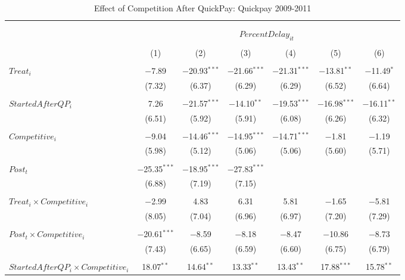 \documentclass[
]{article}
\begin{document}
\begin{table}[H] \centering 
  \caption{Effect of Competition After QuickPay: Quickpay 2009-2011} 
  \label{} 
\small 
\begin{tabular}{@{\extracolsep{-3pt}}lcccccc} 
\\[-1.8ex]\hline 
\hline \\[-1.8ex] 
\\[-1.8ex] & \multicolumn{6}{c}{$PercentDelay_{it}$  } \\ 
\\[-1.8ex] & (1) & (2) & (3) & (4) & (5) & (6)\\ 
\hline \\[-1.8ex] 
 $Treat_i$ & $-$7.89 & $-$20.93$^{***}$ & $-$21.66$^{***}$ & $-$21.31$^{***}$ & $-$13.81$^{**}$ & $-$11.49$^{*}$ \\ 
  & (7.32) & (6.37) & (6.29) & (6.29) & (6.52) & (6.64) \\ 
  & & & & & & \\ 
 $StartedAfterQP_i$ & 7.26 & $-$21.57$^{***}$ & $-$14.10$^{**}$ & $-$19.53$^{***}$ & $-$16.98$^{***}$ & $-$16.11$^{**}$ \\ 
  & (6.51) & (5.92) & (5.91) & (6.08) & (6.26) & (6.32) \\ 
  & & & & & & \\ 
 $Competitive_i$ & $-$9.04 & $-$14.46$^{***}$ & $-$14.95$^{***}$ & $-$14.71$^{***}$ & $-$1.81 & $-$1.19 \\ 
  & (5.98) & (5.12) & (5.06) & (5.06) & (5.60) & (5.71) \\ 
  & & & & & & \\ 
 $Post_t$ & $-$25.35$^{***}$ & $-$18.95$^{***}$ & $-$27.83$^{***}$ &  &  &  \\ 
  & (6.88) & (7.19) & (7.15) &  &  &  \\ 
  & & & & & & \\ 
 $Treat_i \times Competitive_i$ & $-$2.99 & 4.83 & 6.31 & 5.81 & $-$1.65 & $-$5.81 \\ 
  & (8.05) & (7.04) & (6.96) & (6.97) & (7.20) & (7.29) \\ 
  & & & & & & \\ 
 $Post_t \times Competitive_i$ & $-$20.61$^{***}$ & $-$8.59 & $-$8.18 & $-$8.47 & $-$10.86 & $-$8.73 \\ 
  & (7.43) & (6.65) & (6.59) & (6.60) & (6.75) & (6.79) \\ 
  & & & & & & \\ 
 $StartedAfterQP_i \times Competitive_i$ & 18.07$^{**}$ & 14.64$^{**}$ & 13.33$^{**}$ & 13.43$^{**}$ & 17.88$^{***}$ & 15.78$^{**}$ \\ 

\end{tabular}
\end{table}
\end{document}
